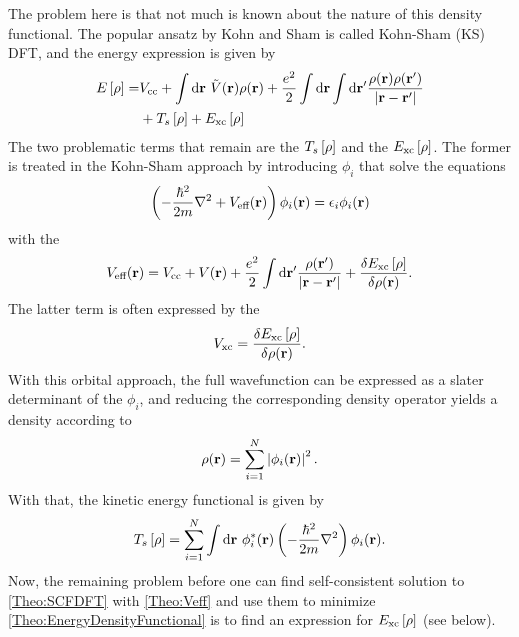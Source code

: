 \documentclass[8.5pt,twoside,twocolumn]{article}
\newcommand\di{\te{d}}
\renewcommand\r{\bo r}
\newcommand\indr{\enmat{\int\di \r}}
\theoremstyle{standard}
\begin{document}
The problem here is that not much is known about the nature of this density functional. The
popular ansatz by Kohn and Sham \cite{KohnSham} is called Kohn-Sham (KS) DFT, and the energy
expression is given by
\newcommand\er{\ed{\rho}}
\newcommand\exc{E_{\te{xc}}}
\begin{equation}
\begin{aligned}
 E\ed{\rho}=&\vcc+\indr\ \tilde V(\r) \rho(\r) + \frac {e^2}{2}\indr\indr' \frac {\rho(\r)\rho(\r')}{\abs{\r-\r'}}\\
 &+T_s 	\ed{\rho}+\exc\ed{\rho}
\end{aligned}
\label{Theo:EnergyDensityFunctional}
\end{equation}
The two problematic terms that remain are the  $T_s\er$ and the
 $\exc\er$. The former is treated in the Kohn-Sham approach
by  introducing  $\phi_i$ that solve the equations
\newcommand\veff{V_{\te{eff}}}
\newcommand\hm{\frac{\hbar^2}{2m}}
\begin{equation}
\rb{-\frac{\hbar^2}{2m} \nabla^2 + \veff(\r)} \phi_i(\r) = \eps_i \phi_i(\r)
\label{Theo:SCFDFT}
\end{equation}
with the 
\begin{equation}
\veff(\r)=\vcc+V(\r) + \frac {e^2}2 \indr' \frac{\rho(\r')}{\abs{\r-\r'}}+\delti{\exc\er}{\rho(\r)}.
\label{Theo:Veff}
\end{equation}
The latter term is often expressed by the 
\newcommand\vxc{V_{\te{xc}}}
\begin{equation}
\vxc=\delti{\exc\er}{\rho(\r)}.
\label{Theo:Vxc}
\end{equation}
With this orbital approach, the full wavefunction can be expressed as a slater determinant of 
the $\phi_i$, and reducing the corresponding density operator yields a density according to
\begin{equation}
\rho(\r)=\sum_{i=1}^N \abs{\phi_i(\r)}^2.
\label{Theo:RhoByPhi}
\end{equation}
With that, the kinetic energy functional is given by
\begin{equation}
T_s\er=\sum_{i=1}^N \indr\ \phi_i^*(\r) \rb{-\hm \nabla^2} \phi_i(\r).
\end{equation}
Now, the remaining problem before one can find self-consistent solution to \eqref{Theo:SCFDFT}
with \eqref{Theo:Veff} and use them to minimize \eqref{Theo:EnergyDensityFunctional} is to
find an expression for $\exc\er$ (see below).
\end{document}
